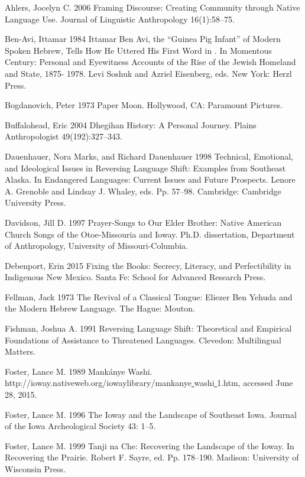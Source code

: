 \documentclass[output=paper]{LSP/langsci}
\begin{document}
\begin{reflist}

Ahlers, Jocelyn C. 2006 Framing Discourse: Creating Community through Native Language Use. Journal of Linguistic Anthropology 16(1):58--75.

Ben-Avi, Ittamar 1984 Ittamar Ben Avi, the ``Guinea Pig Infant'' of Modern Spoken Hebrew, Tells How He Uttered His First Word in \citet{Hebrew1885}. In Momentous Century: 	Personal and Eyewitness Accounts of the Rise of the Jewish Homeland and State, 1875-	1978. Levi Soshuk and Azriel Eisenberg, eds. New York: Herzl Press.

Bogdanovich, Peter 1973 Paper Moon. Hollywood, CA: Paramount Pictures.

Buffalohead, Eric 2004 Dhegihan History: A Personal Journey. Plains Anthropologist 49(192):327--343.

Dauenhauer, Nora Marks, and Richard Dauenhauer 1998 Technical, Emotional, and Ideological Issues in Reversing Language Shift: Examples from Southeast Alaska. In Endangered Languages: Current Issues and Future Prospects. Lenore A. Grenoble and Lindsay J. Whaley, eds. Pp. 57--98. Cambridge: Cambridge University Press.

Davidson, Jill D. 1997 Prayer-Songs to Our Elder Brother: Native American Church Songs of the Otoe-Missouria and Ioway. Ph.D. dissertation, Department of Anthropology, University of Missouri-Columbia.

Debenport, Erin 2015 Fixing the Books: Secrecy, Literacy, and Perfectibility in Indigenous New Mexico. Santa Fe: School for Advanced Research Press.

Fellman, Jack 1973 The Revival of a Classical Tongue: Eliezer Ben Yehuda and the Modern Hebrew Language. The Hague: Mouton.

Fishman, Joshua A. 1991 Reversing Language Shift: Theoretical and Empirical Foundations of Assistance to Threatened Languages. Clevedon: Multilingual Matters.

Foster, Lance M. 1989 Mankánye Washi. http://ioway.nativeweb.org/iowaylibrary/mankanye\underline{ }washi\underline{ }1.htm, accessed June 28, 2015.

Foster, Lance M. 1996 The Ioway and the Landscape of Southeast Iowa. Journal of the Iowa Archeological Society 43: 1--5.

Foster, Lance M. 1999 Tanji na Che: Recovering the Landscape of the Ioway. In Recovering the Prairie. Robert F. Sayre, ed. Pp. 178--190. Madison: University of Wisconsin Press.


\end{reflist}
\end{document}
